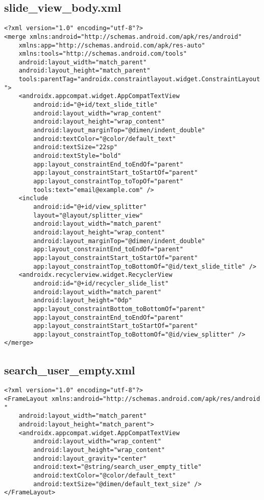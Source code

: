 \documentclass[listing]{espd}
\begin{document}
\subsection{slide\_view\_body.xml}
\begin{verbatim}
<?xml version="1.0" encoding="utf-8"?>
<merge xmlns:android="http://schemas.android.com/apk/res/android"
    xmlns:app="http://schemas.android.com/apk/res-auto"
    xmlns:tools="http://schemas.android.com/tools"
    android:layout_width="match_parent"
    android:layout_height="match_parent"
    tools:parentTag="androidx.constraintlayout.widget.ConstraintLayout
">
    <androidx.appcompat.widget.AppCompatTextView
        android:id="@+id/text_slide_title"
        android:layout_width="wrap_content"
        android:layout_height="wrap_content"
        android:layout_marginTop="@dimen/indent_double"
        android:textColor="@color/default_text"
        android:textSize="22sp"
        android:textStyle="bold"
        app:layout_constraintEnd_toEndOf="parent"
        app:layout_constraintStart_toStartOf="parent"
        app:layout_constraintTop_toTopOf="parent"
        tools:text="email@example.com" />
    <include
        android:id="@+id/view_splitter"
        layout="@layout/splitter_view"
        android:layout_width="match_parent"
        android:layout_height="wrap_content"
        android:layout_marginTop="@dimen/indent_double"
        app:layout_constraintEnd_toEndOf="parent"
        app:layout_constraintStart_toStartOf="parent"
        app:layout_constraintTop_toBottomOf="@id/text_slide_title" />
    <androidx.recyclerview.widget.RecyclerView
        android:id="@+id/recycler_slide_list"
        android:layout_width="match_parent"
        android:layout_height="0dp"
        app:layout_constraintBottom_toBottomOf="parent"
        app:layout_constraintEnd_toEndOf="parent"
        app:layout_constraintStart_toStartOf="parent"
        app:layout_constraintTop_toBottomOf="@id/view_splitter" />
</merge>
\end{verbatim}

\subsection{search\_user\_empty.xml}
\begin{verbatim}
<?xml version="1.0" encoding="utf-8"?>
<FrameLayout xmlns:android="http://schemas.android.com/apk/res/android
"
    android:layout_width="match_parent"
    android:layout_height="match_parent">
    <androidx.appcompat.widget.AppCompatTextView
        android:layout_width="wrap_content"
        android:layout_height="wrap_content"
        android:layout_gravity="center"
        android:text="@string/search_user_empty_title"
        android:textColor="@color/default_text"
        android:textSize="@dimen/default_text_size" />
</FrameLayout>
\end{verbatim}
\end{document}
